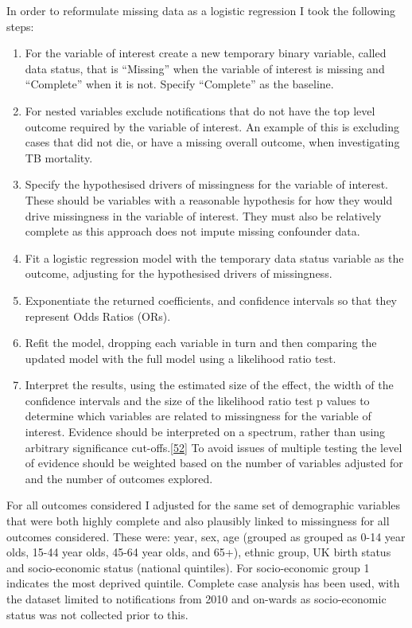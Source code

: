 \documentclass[11pt,twoside]{bristolthesis}
\begin{document}
  In order to reformulate missing data as a logistic regression I took the following steps:
  \begin{enumerate}
  \def\labelenumi{\arabic{enumi}.}
  \item
    For the variable of interest create a new temporary binary variable, called data status, that is ``Missing'' when the variable of interest is missing and ``Complete'' when it is not. Specify ``Complete'' as the baseline.
  \item
    For nested variables exclude notifications that do not have the top level outcome required by the variable of interest. An example of this is excluding cases that did not die, or have a missing overall outcome, when investigating TB mortality.
  \item
    Specify the hypothesised drivers of missingness for the variable of interest. These should be variables with a reasonable hypothesis for how they would drive missingness in the variable of interest. They must also be relatively complete as this approach does not impute missing confounder data.
  \item
    Fit a logistic regression model with the temporary data status variable as the outcome, adjusting for the hypothesised drivers of missingness.
  \item
    Exponentiate the returned coefficients, and confidence intervals so that they represent Odds Ratios (ORs).
  \item
    Refit the model, dropping each variable in turn and then comparing the updated model with the full model using a likelihood ratio test.
  \item
    Interpret the results, using the estimated size of the effect, the width of the confidence intervals and the size of the likelihood ratio test p values to determine which variables are related to missingness for the variable of interest. Evidence should be interpreted on a spectrum, rather than using arbitrary significance cut-offs.{[}\protect\hyperlink{ref-Sterne2001}{52}{]} To avoid issues of multiple testing the level of evidence should be weighted based on the number of variables adjusted for and the number of outcomes explored.
  \end{enumerate}
  For all outcomes considered I adjusted for the same set of demographic variables that were both highly complete and also plausibly linked to missingness for all outcomes considered. These were: year, sex, age (grouped as grouped as 0-14 year olds, 15-44 year olds, 45-64 year olds, and 65+), ethnic group, UK birth status and socio-economic status (national quintiles). For socio-economic group 1 indicates the most deprived quintile. Complete case analysis has been used, with the dataset limited to notifications from 2010 and on-wards as socio-economic status was not collected prior to this.
  
\end{document}
